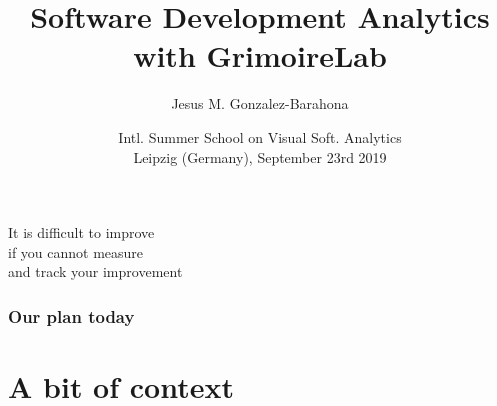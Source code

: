 \documentclass[17pt,aspectratio=169,hyperref=pdfusetitle]{beamer}
\begin{document}
\title[Analytics with GrimoireLab]{Software Development Analytics with GrimoireLab}
\author[Jesus M. Gonzalez-Barahona]{Jesus M. Gonzalez-Barahona}

\date[Visual Software Analytics]{Intl. Summer School on Visual Soft. Analytics \\ Leipzig (Germany), September 23rd 2019}

\begin{frame}
  \maketitle
\end{frame}

\begin{frame}

  {\em
    \begin{center}
      It is difficult to improve \\
      if you cannot measure \\
      and track your improvement \\
    \end{center}
  }
\end{frame}


\begin{frame}
\frametitle{Our plan today}

\tableofcontents
\end{frame}

\section{A bit of context}

\end{document}
